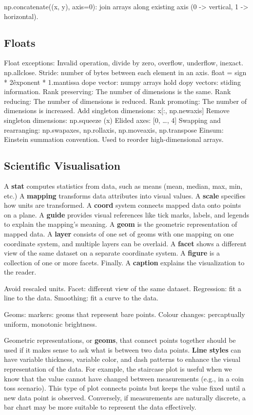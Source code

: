 \documentclass{article}
\begin{document}
np.concatenate((x, y), axis=0): join arrays along existing axis (0 -> vertical, 1 -> horizontal).

\subsection*{Floats}
Float exceptions:
Invalid operation, divide by zero, overflow, underflow, inexact.
np.allclose.
Stride: number of bytes between each element in an axis.
float = sign * 2\^{exponent} * 1.mantissa
dope vector:
numpy arrays hold dopy vectors: stiding information.
Rank preserving: The number of dimensions is the same.
Rank reducing: The number of dimensions is reduced.
Rank promoting: The number of dimensions is increased.
Add singleton dimensions: x[:, np.newaxis]
Remove singleton dimensions: np.squeeze (x)
Elided axes: [0, \ldots, 4]
Swapping and rearranging: np.swapaxes, np.rollaxis, np.moveaxis, np.transpose
Einsum: Einstein summation convention. Used to reorder high-dimensional arrays.

\subsection*{Scientific Visualisation}

A \textbf{stat} computes statistics from data, such as means (mean, median, max, min,  etc.)
A \textbf{mapping} transforms data attributes into visual values.
A \textbf{scale} specifies how units are transformed.
A \textbf{coord} system connects mapped data onto points on a plane.
A \textbf{guide} provides visual references like tick marks, labels, and legends to explain the mapping's meaning.
A \textbf{geom} is the geometric representation of mapped data.
A \textbf{layer} consists of one set of geoms with one mapping on one coordinate system, and multiple layers can be overlaid.
A \textbf{facet} shows a different view of the same dataset on a separate coordinate system.
A \textbf{figure} is a collection of one or more facets. Finally.
A \textbf{caption} explains the visualization to the reader.

\noindent Avoid rescaled units. Facet: different view of the same dataset.
Regression: fit a line to the data. Smoothing: fit a curve to the data.

\noindent Geoms: markers: geoms that represent bare points.
Colour changes: percaptually uniform, monotonic brightness.

\noindent Geometric representations, or \textbf{geoms}, that connect points together should be used if it makes sense to ask what is between two data points.
\textbf{Line styles} can have variable thickness, variable color, and dash patterns to enhance the visual representation of the data.
For example, the staircase plot is useful when we know that the value cannot have changed between measurements (e.g., in a coin toss scenario).
This type of plot connects points but keeps the value fixed until a new data point is observed.
Conversely, if measurements are naturally discrete, a bar chart may be more suitable to represent the data effectively.
\end{document}
